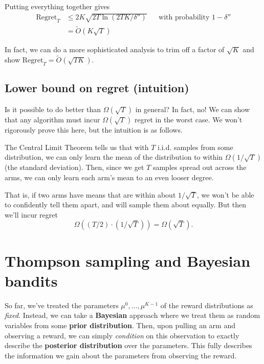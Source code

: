 \documentclass[\main/main]{subfiles}
\begin{document}
Putting everything together gives
\begin{align*}
    \text{Regret}_T &\le 2 K \sqrt{2T \ln(2TK/\delta'')} && \text{with probability } 1-\delta'' \\
    &= \tilde O(K\sqrt{T})
\end{align*}


In fact, we can do a more sophisticated analysis to trim off a factor of $\sqrt{K}$ and show $\text{Regret}_T = \tilde O(\sqrt{TK})$.

\subsection{Lower bound on regret (intuition)}

Is it possible to do better than $\Omega(\sqrt{T})$ in general? In fact, no! We can show that any algorithm must incur $\Omega(\sqrt{T})$ regret in the worst case. We won't rigorously prove this here, but the intuition is as follows.

The Central Limit Theorem tells us that with $T$ i.i.d. samples from some distribution, we can only learn the mean of the distribution to within $\Omega(1/\sqrt{T})$ (the standard deviation). Then, since we get $T$ samples spread out across the arms, we can only learn each arm's mean to an even looser degree.

That is, if two arms have means that are within about $1/\sqrt{T}$, we won't be able to confidently tell them apart, and will sample them about equally. But then we'll incur regret \[ \Omega((T/2) \cdot (1/\sqrt{T})) = \Omega(\sqrt{T}). \]


\section{Thompson sampling and Bayesian bandits}

So far, we've treated the parameters $\mu^0, \dots, \mu^{K-1}$ of the reward distributions as \emph{fixed}. Instead, we can take a \textbf{Bayesian} approach where we treat them as random variables from some \textbf{prior distribution}. Then, upon pulling an arm and observing a reward, we can simply \emph{condition} on this observation to exactly describe the \textbf{posterior distribution} over the parameters. This fully describes the information we gain about the parameters from observing the reward.
\end{document}
